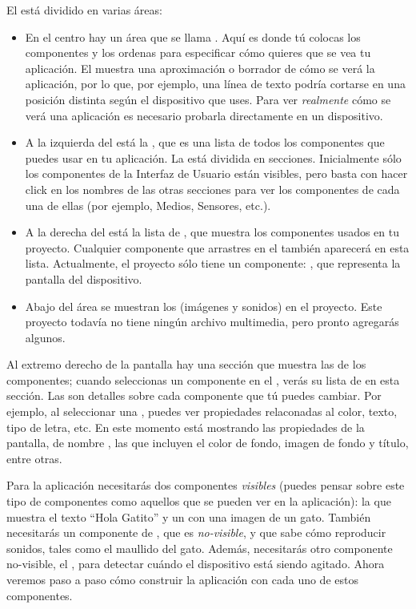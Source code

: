 \documentclass[letterpaper]{article}
\begin{document}
El \designer está dividido en varias áreas:

\begin{itemize}

\item En el centro hay un área que se llama \viewer. Aquí es donde tú
  colocas los componentes y los ordenas para especificar cómo quieres
  que se vea tu aplicación. El \viewer muestra una aproximación o
  borrador de cómo se verá la aplicación, por lo que, por ejemplo, una
  línea de texto podría cortarse en una posición distinta según el
  dispositivo que uses. Para ver \emph{realmente} cómo se verá una
  aplicación es necesario probarla directamente en un dispositivo.

\item A la izquierda del \viewer está la \palette, que es una lista de
  todos los componentes que puedes usar en tu aplicación. La \palette
  está dividida en secciones. Inicialmente sólo los componentes de la
  Interfaz de Usuario están visibles, pero basta con hacer click en
  los nombres de las otras secciones para ver los componentes de cada
  una de ellas (por ejemplo, Medios, Sensores, etc.).

\item A la derecha del \viewer está la lista de \componentList, que
  muestra los componentes usados en tu proyecto. Cualquier componente
  que arrastres en el \viewer también aparecerá en esta
  lista. Actualmente, el proyecto sólo tiene un componente:
  , que representa la pantalla del dispositivo.

\item Abajo del área \componentList se muestran los \media (imágenes y
  sonidos) en el proyecto. Este proyecto todavía no tiene ningún
  archivo multimedia, pero pronto agregarás algunos.

\end{itemize}

Al extremo derecho de la pantalla hay una sección que muestra las
\properties de los componentes; cuando seleccionas un componente en el
\viewer, verás su lista de \properties en esta sección. Las
\properties son detalles sobre cada componente que tú puedes
cambiar. Por ejemplo, al seleccionar una , puedes
ver propiedades relaconadas al color, texto, tipo de letra, etc. En
este momento está mostrando las propiedades de la pantalla, de nombre
, las que incluyen el color de fondo, imagen de
fondo y título, entre otras.

Para la aplicación  necesitarás dos componentes
\emph{visibles} (puedes pensar sobre este tipo de componentes como
aquellos que se pueden ver en la aplicación): la 
que muestra el texto ``Hola Gatito'' y un  con una
imagen de un gato. También necesitarás un componente de
, que es \emph{no-visible}, y que sabe cómo
reproducir sonidos, tales como el maullido del gato. Además,
necesitarás otro componente no-visible, el ,
para detectar cuándo el dispositivo está siendo agitado. Ahora veremos
paso a paso cómo construir la aplicación con cada uno de estos
componentes.
\end{document}
